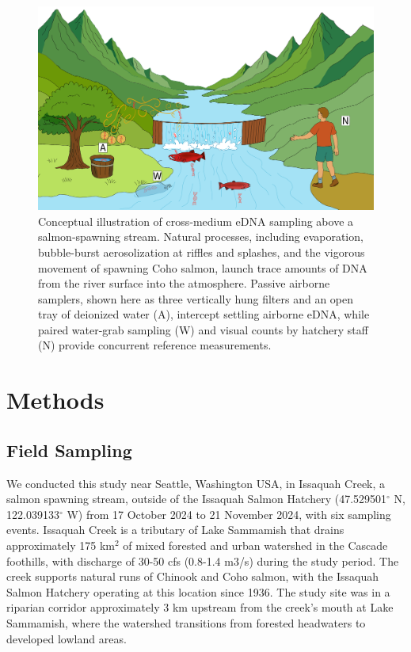 \documentclass{article}
\begin{document}
\begin{figure}[tbhp] 
\centering
\includegraphics[width=13.5cm]{Plots/Figure_1.pdf}  
\caption{Conceptual illustration of cross‐medium eDNA sampling above a salmon‐spawning stream. Natural processes, including evaporation, bubble-burst aerosolization at riffles and splashes, and the vigorous movement of spawning Coho salmon, launch trace amounts of DNA from the river surface into the atmosphere. Passive airborne samplers, shown here as three vertically hung filters and an open tray of deionized water (A), intercept settling airborne eDNA, while paired water-grab sampling (W) and visual counts by hatchery staff (N) provide concurrent reference measurements.}
\label{fig:AI_physical_model}
\end{figure}

\section{Methods}

\subsection{Field Sampling}

We conducted this study near Seattle, Washington USA, in Issaquah Creek, a salmon spawning stream, outside of the Issaquah Salmon Hatchery (47.529501$^\circ$ N, 122.039133$^\circ$ W) from 17 October 2024 to 21 November 2024, with six sampling events. Issaquah Creek is a tributary of Lake Sammamish that drains approximately 175 km$^2$ of mixed forested and urban watershed in the Cascade foothills, with discharge of 30-50 cfs (0.8-1.4 m$3$/s) during the study period. The creek supports natural runs of Chinook and Coho salmon, with the Issaquah Salmon Hatchery operating at this location since 1936. The study site was in a riparian corridor approximately 3 km upstream from the creek's mouth at Lake Sammamish, where the watershed transitions from forested headwaters to developed lowland areas.
\end{document}
